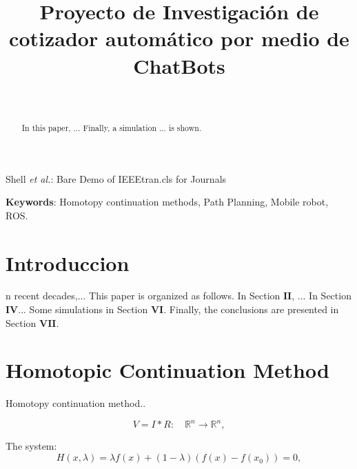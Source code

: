 \documentclass[conference]{IEEEtran}
\begin{document}
\title{Proyecto de Investigación de cotizador automático por medio de ChatBots}
\author{
\\
}



\markboth{}%
{Shell \MakeLowercase{\textit{et al.}}: Bare Demo of IEEEtran.cls for Journals}

\maketitle


 
\begin{abstract}
 In this paper, ... Finally, a simulation ... is shown.
\end{abstract}
\vspace{0.5cm}
\textbf{Keywords}:  Homotopy continuation methods, Path Planning, Mobile  robot, ROS.

\IEEEpeerreviewmaketitle
\section{Introduccion}
n recent decades,... This paper is organized as follows. In Section $\mathbf{II}$, ... In Section $\mathbf{IV}$... Some simulations in Section $\mathbf{VI}$. Finally, the conclusions are presented in Section $\mathbf{VII}$.

\section{Homotopic Continuation Method}

Homotopy continuation method..

\begin{equation}
\label{ohm}
V=I*R:\quad\mathbb{R}^{n}\longrightarrow\mathbb{R}^{n},
\end{equation}

The system:  
 \begin{equation}
    \label{Homotopia_G}
     H(x,\lambda)= \lambda f(x)+ (1-\lambda)(f(x)- f(x_0))=0,
 \end{equation}
 
\end{document}
